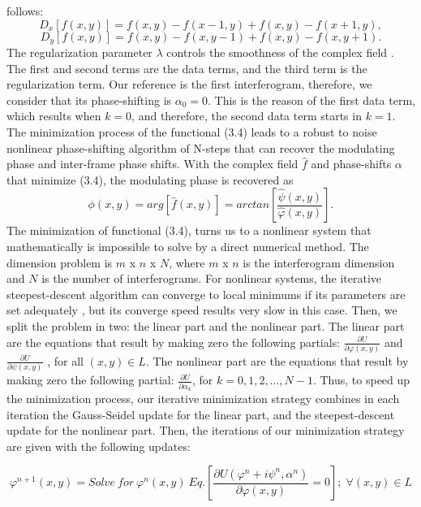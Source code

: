 follows:
\begin{equation}
D_{x}[f(x,y)]=f(x,y)-f(x-1,y)+f(x,y)-f(x+1,y),
\end{equation}
\begin{equation}
D_{y}[f(x,y)]=f(x,y)-f(x,y-1)+f(x,y)-f(x,y+1).
\end{equation}
The regularization parameter $\lambda$ controls the smoothness of
the complex field \cite{RQF,AQF_mult}. The first and second terms are
the data terms, and the third term is the regularization term. Our
reference is the first interferogram, therefore, we consider that
its phase-shifting is $\alpha_{0}=0$. This is the reason of the first
data term, which results when $k=0$, and therefore, the second data
term starts in $k=1$. The minimization process of the functional
(3.4) leads to a robust to noise nonlinear phase-shifting algorithm
of N-steps that can recover the modulating phase and inter-frame phase
shifts. With the complex field $\widehat{f}$ and phase-shifts $\alpha$
that minimize (3.4), the modulating phase is recovered as 
\begin{equation}
\phi(x,y)=arg[\widehat{f}(x,y)]=arctan\left[\frac{\hat{\psi}(x,y)}{\widehat{
\varphi}(x,y)}\right].\label{eq:fi}
\end{equation}
The minimization of functional (3.4), turns us to a nonlinear system
that mathematically is impossible to solve by a direct numerical method.
The dimension problem is $m$ x $n$ x $N$, where $m$ x $n$ is
the interferogram dimension and $N$ is the number of interferograms.
For nonlinear systems, the iterative\emph{ }steepest-descent algorithm
can converge to local minimums if its parameters are set adequately
\cite{Nocedal}, but its converge speed results very slow in this case.
Then, we split the problem in two: the linear part and the nonlinear
part. The linear part are the equations that result by making zero
the following partials: $\frac{\partial U}{\partial\varphi(x,y)}$
and $\frac{\partial U}{\partial\psi(x,y)}$ , for all $(x,y)\in L$.
The nonlinear part are the equations that result by making zero the
following partial: $\frac{\partial U}{\partial\alpha_{k}}$, for $k=0,1,2,...,N-
1$.
Thus, to speed up the minimization process, our iterative minimization
strategy combines in each iteration the Gauss-Seidel update for the
linear part, and the steepest-descent update for the nonlinear part.
Then, the iterations of our minimization strategy are given with the
following updates: 

\begin{equation}
\varphi^{n+1}(x,y)=Solve\: for\:\varphi^{n}(x,y)\: Eq.\left[\frac{\partial U(
\varphi^{n}+i\psi^{n},\alpha^{n})}{\partial\varphi(x,y)}=0\right];\;\forall(x,y)
\in L
\end{equation}


